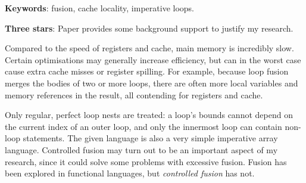 \documentclass[12pt,a4paper]{article}
\begin{document}
{\bf Keywords}: fusion, cache locality, imperative loops.

{\bf Three stars}: Paper provides some background support to justify my research.


Compared to the speed of registers and cache, main memory is incredibly slow.
Certain optimisations may generally increase efficiency, but can in the worst case cause extra cache misses or register spilling.
For example, because loop fusion merges the bodies of two or more loops, there are often more local variables
and memory references in the result, all contending for registers and cache.

Only regular, perfect loop nests are treated: a loop's bounds cannot depend on the current index of an outer loop,
and only the innermost loop can contain non-loop statements.
The given language is also a very simple imperative array language.
Controlled fusion may turn out to be an important aspect of my research,
since it could solve some problems with excessive fusion.
Fusion has been explored in functional languages, but \emph{controlled fusion} has not.



\pagebreak
{}
\nocite{*}


\end{document}
